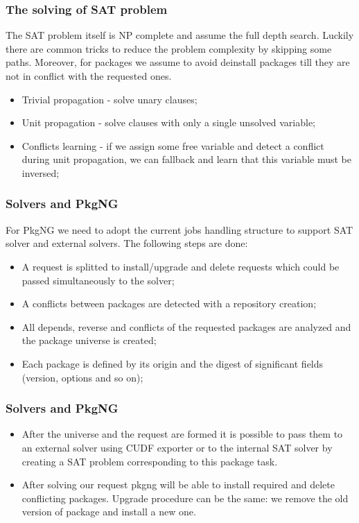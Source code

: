 \documentclass{beamer}
\begin{document}
\begin{frame}
\frametitle{The solving of SAT problem}

The SAT problem itself is NP complete and assume the full depth search. Luckily
there are common tricks to reduce the problem complexity by skipping some paths.
Moreover, for packages we assume to avoid deinstall packages till they are not
in conflict with the requested ones.
\begin{itemize}
  \item Trivial propagation - solve unary clauses;
  \item Unit propagation - solve clauses with only a single unsolved variable;
  \item Conflicts learning - if we assign some free variable and detect a
  conflict during unit propagation, we can fallback and learn that this variable
  must be inversed;
\end{itemize}
\end{frame}

\begin{frame}
\frametitle{Solvers and PkgNG}

For PkgNG we need to adopt the current jobs handling structure to support SAT
solver and external solvers. The following steps are done:
\begin{itemize}
  \item A request is splitted to install/upgrade and delete requests which
  could be passed simultaneously to the solver;
  \item A conflicts between packages are detected with a repository creation;
  \item All depends, reverse and conflicts of the requested packages are
  analyzed and the package universe is created;
  \item Each package is defined by its origin and the digest of significant
  fields (version, options and so on);
\end{itemize}
\end{frame}

\begin{frame}
\frametitle{Solvers and PkgNG}
\begin{itemize}
  \item After the universe and the request are formed it is possible to pass them to an
external solver using CUDF exporter or to the internal SAT solver by creating a
SAT problem corresponding to this package task.
  \item After solving our request pkgng will be able to install required and
delete conflicting packages. Upgrade procedure can be the same: we remove the old
version of package and install a new one.
\end{itemize}
\end{frame}
\end{document}
